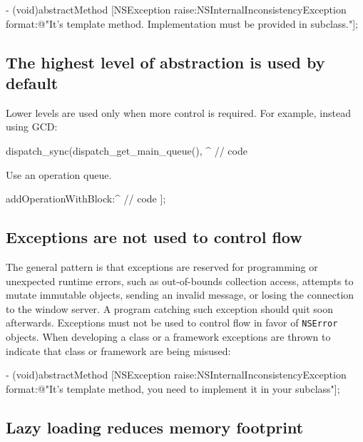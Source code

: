 \documentclass[10pt]{extarticle}
\newcommand{\inlinecode}[1]{{\textcolor{TundoraColor}{\texttt{#1}}}}
\begin{document}
\begin{codelisting}
- (void)abstractMethod
{
    [NSException raise:NSInternalInconsistencyException 
                format:@"It's template method. Implementation must be provided in subclass."];
}
\end{codelisting}


\subsection{The highest level of abstraction is used by default}

Lower levels are used only when more control is required. For example, instead using GCD:

\begin{codelisting}
dispatch_sync(dispatch_get_main_queue(), ^{
    // code
}
\end{codelisting}

Use an operation queue.

\begin{codelisting}
[[NSOperationQueue mainQueue] addOperationWithBlock:^{
    // code
}];
\end{codelisting}


\subsection{Exceptions are not used to control flow}

The general pattern is that exceptions are reserved for programming or unexpected runtime errors, such as out-of-bounds collection access, attempts to mutate immutable objects, sending an invalid message, or losing the connection to the window server. A program catching such exception should quit soon afterwards. Exceptions must not be used to control flow in favor of \inlinecode{NSError} objects.
When developing a class or a framework exceptions are thrown to indicate that class or framework are being misused:

\begin{codelisting}
- (void)abstractMethod
{
    [NSException raise:NSInternalInconsistencyException 
                format:@"It's template method, you need to implement it in your subclass"];
}
\end{codelisting}


\subsection{Lazy loading reduces memory footprint}
\end{document}
